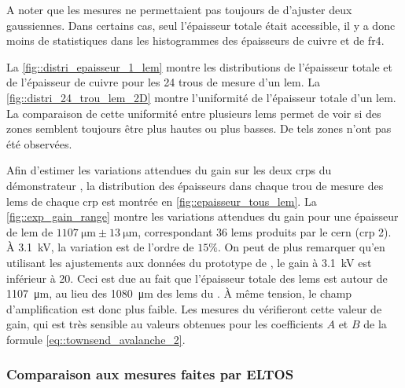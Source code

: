         A noter que les mesures ne permettaient pas toujours de d'ajuster deux gaussiennes. Dans certains cas, seul l'épaisseur totale était accessible, il y a donc moins de statistiques dans les histogrammes des épaisseurs de cuivre et de \gls{fr4}.
                
        La \autoref{fig::distri_epaisseur_1_lem} montre les distributions de l'épaisseur totale et de l'épaisseur de cuivre pour les 24 trous de mesure d'un \gls{lem}. La \autoref{fig::distri_24_trou_lem_2D} montre l'uniformité de l'épaisseur totale d'un \gls{lem}. La comparaison de cette uniformité entre plusieurs \glspl{lem} permet de voir si des zones semblent toujours être plus hautes ou plus basses. De tels zones n'ont pas été observées.
                
        Afin d'estimer les variations attendues du gain sur les deux \glspl{crp} du démonstrateur \SSS{}, la distribution des épaisseurs dans chaque trou de mesure des \glspl{lem} de chaque \gls{crp} est montrée en \autoref{fig::epaisseur_tous_lem}. La \autoref{fig::exp_gain_range} montre les variations attendues du gain pour une épaisseur de \gls{lem} de $\SI{1107}{\micro\meter}\pm\SI{13}{\micro\meter}$, correspondant 36 \glspl{lem} produits par le \gls{cern} (\gls{crp} 2). À \SI{3.1}{\kilo\volt}, la variation est de l'ordre de $15\%$. On peut de plus remarquer qu'en utilisant les ajustements aux données du prototype de \threeL{}, le gain à \SI{3.1}{\kilo\volt} est inférieur à 20. Ceci est due au fait que l'épaisseur totale des \glspl{lem} est autour de \SI{1107}{\micro\meter}, au lieu des \SI{1080}{\micro\meter} des \glspl{lem} du \threeL{}. À même tension, le champ d'amplification est donc plus faible. Les mesures du \SSS{} vérifieront cette valeur de gain, qui est très sensible au valeurs obtenues pour les coefficients $A$ et $B$ de la formule \eqref{eq::townsend_avalanche_2}.
                
                
      \subsubsection{Comparaison aux mesures faites par ELTOS}\label{sec::thickness_comparison_eltos}
            
